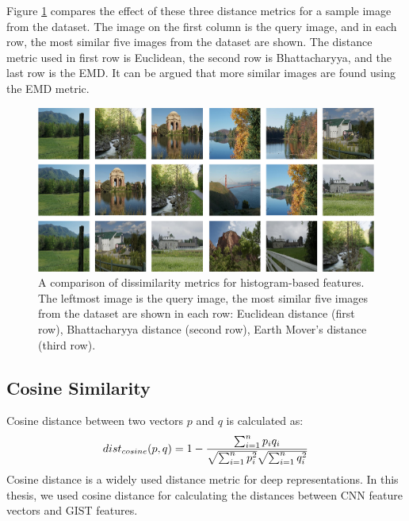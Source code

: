 Figure \ref{fig:sim_comp} compares the effect of these three distance metrics for a sample image from the dataset. The image on the first column is the query image, and in each row, the most similar five images from the dataset are shown. The distance metric used in first row is Euclidean, the second row is Bhattacharyya, and the last row is the EMD. It can be argued that more similar images are found using the EMD metric.

\begin{figure} 
\centering
\caption{A comparison of dissimilarity metrics for histogram-based features. The leftmost image is the query image, the most similar five images from the dataset are shown in each row: Euclidean distance (first row), Bhattacharyya distance (second row), Earth Mover’s distance (third row).}
\label{fig:sim_comp}
\includegraphics[width=\textwidth]{figures/chapter2/16sims.png}
\vspace{10pt}
\end{figure}

\subsection{Cosine Similarity}
Cosine distance between two vectors $p$ and $q$ is calculated as:
\begin{equation}
dist_{cosine}(p,q) = 1 - {{\sum_{i=1}^{n}p_{i}q_{i}} \over {\sqrt{\sum_{i=1}^{n}p_{i}^2}} \sqrt{\sum_{i=1}^{n}q_{i}^2}} 
\end{equation}
Cosine distance is a widely used distance metric for deep representations. In this thesis, we used cosine distance for calculating the distances between CNN feature vectors and GIST features.